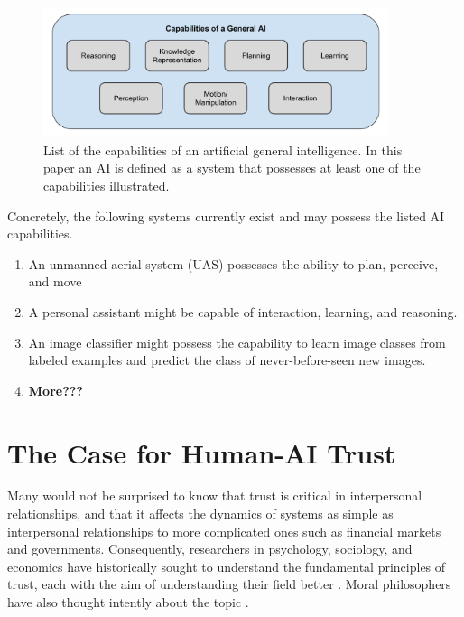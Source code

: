 	\begin{figure}[htbp]
    	\centering
     	\includegraphics[width=0.9\textwidth]{Figures/AI_capabilities}
    	\caption{List of the capabilities of an artificial general intelligence. In this paper an AI is defined as a system that possesses at least one of the capabilities illustrated.}
        \label{fig:AIcapabilities}
    \end{figure}

    Concretely, the following systems currently exist and may possess the listed AI capabilities.
    
    \begin{enumerate}
         \item An unmanned aerial system (UAS) possesses the ability to plan, perceive, and move
         \item A personal assistant might be capable of interaction, learning, and reasoning.
         \item An image classifier might possess the capability to learn image classes from labeled examples and predict the class of never-before-seen new images.
         \item \textbf{More???}
     \end{enumerate}

\section{The Case for Human-AI Trust}
    Many would not be surprised to know that trust is critical in interpersonal relationships, and that it affects the dynamics of systems as simple as interpersonal relationships to more complicated ones such as financial markets \cite{Fukuyama1995-un} and governments. Consequently, researchers in psychology, sociology, and economics have historically sought to understand the fundamental principles of trust, each with the aim of understanding their field better \cite{Gambetta1988-pi}. Moral philosophers have also thought intently about the topic \cite{Baier1986-im}.

